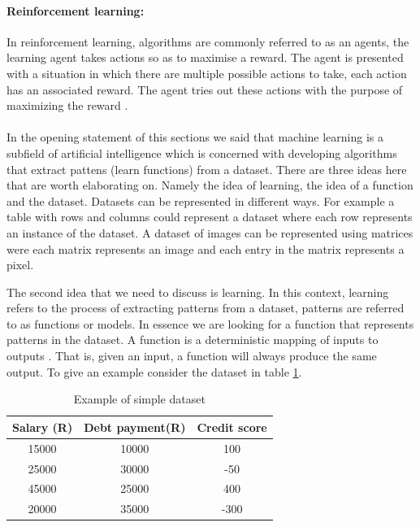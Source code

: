 \documentclass[a4paper,11pt]{article}
\begin{document}
\paragraph{Reinforcement learning:}
In reinforcement learning, algorithms are commonly referred to as an agents,  the learning agent takes actions so as to maximise a reward. The agent is presented with a situation in which there are multiple possible actions to take, each action has an associated reward. The agent tries out these actions with the purpose of maximizing the reward \citep{Sutton1998}. 

\paragraph{}
In the opening statement of this sections we said that machine learning is a subfield of artificial intelligence which is concerned with developing algorithms that extract pattens (learn functions) from a dataset.  There are three ideas here that are worth elaborating on. Namely the idea of learning, the idea of a function and the dataset. Datasets can be represented in different ways. For example a table with rows and columns could represent a dataset where each row represents an instance of the dataset. A dataset of images can be represented using matrices were each matrix represents an image and each entry in the matrix represents a pixel.

The second idea that we need to discuss is learning. In this context, learning refers to the process of extracting patterns from a dataset, patterns are referred to as functions or models. In essence we are looking for a function that represents patterns in the dataset. A function is a deterministic mapping of inputs to outputs \citep{John}. That is, given an input, a function will always produce the same output. To give an example consider the dataset in table \ref{tab: datasetExample}. 

\begin{table}[!htbp]
\begin{centering}
\begin{tabular}{|c|c|c|}

\hline 
Salary (R) & Debt payment(R) & Credit score \\ 
\hline 
15000 & 10000 & 100 \\ 
\hline 
25000 & 30000 & -50 \\ 
\hline 
45000 & 25000 & 400 \\ 
\hline 
20000 & 35000 & -300 \\ 
\hline
\end{tabular} 
\caption{Example of simple dataset}
\label{tab: datasetExample} 
\end{centering}
\end{table}
\end{document}
